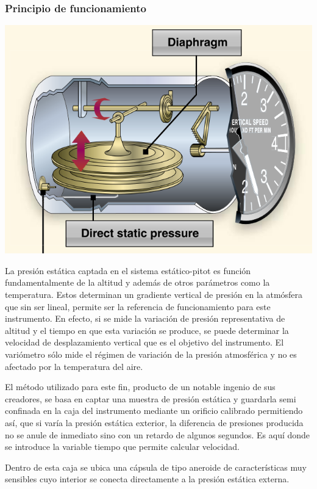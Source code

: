 \documentclass{article}
\begin{document}
\subsubsection*{Principio de funcionamiento}
\begin{center}
\includegraphics[scale=0.5]{figuras/vsi.png}
\label{fig:alturas}
\end{center}
La presión estática captada en el sistema estático-pitot es función fundamentalmente de la altitud y además de otros parámetros como la temperatura. Estos determinan un gradiente vertical de presión en la atmósfera que sin ser lineal, permite ser la referencia de funcionamiento para este instrumento. En efecto, si se mide la variación de presión representativa de altitud y el tiempo en que esta variación se produce, se puede determinar la velocidad de desplazamiento vertical que es el objetivo del instrumento. El variómetro sólo mide el régimen de variación de la presión atmosférica y no es afectado por la temperatura del aire.

El método utilizado para este fin, producto de un notable ingenio de sus creadores, se basa en captar una muestra de presión estática y guardarla semi confinada en la caja del instrumento mediante un orificio calibrado permitiendo así, que si varía la presión estática exterior, la diferencia de presiones producida no se anule de inmediato sino con un retardo de algunos segundos. Es aquí donde se introduce la variable tiempo que permite calcular velocidad.

Dentro de esta caja se ubica una cápsula de tipo aneroide de características muy sensibles cuyo interior se conecta directamente a la presión estática externa.
\end{document}
